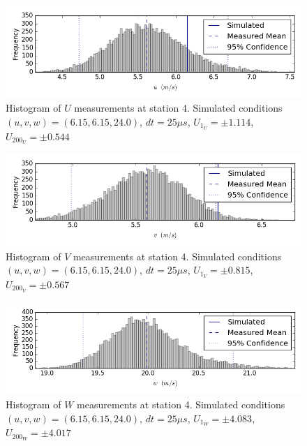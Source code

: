 \begin{figure}[H]
\centering
\includegraphics[width=6in]{figs/Ely_May28th04001/uncertainty_Ely_May28th04001_U}
\caption{Histogram of $U$ measurements at station 4. Simulated conditions $(u,v,w)=(6.15, 6.15, 24.0)$, $dt=25 \mu s$, $U_1_U=\pm 1.114$, $U_200_U=\pm 0.544$}
\label{fig:uncertainty_Ely_May28th04001_U}
\end{figure}


\begin{figure}[H]
\centering
\includegraphics[width=6in]{figs/Ely_May28th04001/uncertainty_Ely_May28th04001_V}
\caption{Histogram of $V$ measurements at station 4. Simulated conditions $(u,v,w)=(6.15, 6.15, 24.0)$, $dt=25 \mu s$, $U_1_V=\pm 0.815$, $U_200_V=\pm 0.567$}
\label{fig:uncertainty_Ely_May28th04001_V}
\end{figure}


\begin{figure}[H]
\centering
\includegraphics[width=6in]{figs/Ely_May28th04001/uncertainty_Ely_May28th04001_W}
\caption{Histogram of $W$ measurements at station 4. Simulated conditions $(u,v,w)=(6.15, 6.15, 24.0)$, $dt=25 \mu s$, $U_1_W=\pm 4.083$, $U_200_W=\pm 4.017$}
\label{fig:uncertainty_Ely_May28th04001_W}
\end{figure}


